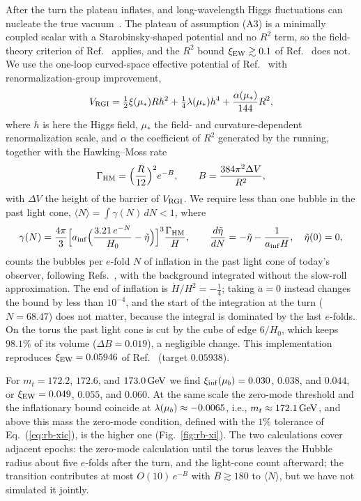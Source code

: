 After the turn the plateau inflates, and long-wavelength Higgs fluctuations can nucleate the true vacuum~\cite{Espinosa:2007qp,Hook:2014uia,Kearney:2015vba,Espinosa:2015qea,Joti:2017fwe,Markkanen:2018pdo}.
The plateau of assumption (A3) is a minimally coupled scalar with a Starobinsky-shaped potential and no $R^2$ term, so the field-theory criterion of Ref.~\cite{Mantziris:2020rzh} applies, and the $R^2$ bound $\xi_{\rm EW}\gtrsim0.1$ of Ref.~\cite{Mantziris:2022fuu} does not. %
We use the one-loop curved-space effective potential of Ref.~\cite{Markkanen:2018bfx} with renormalization-group improvement,
\begin{equation}
V_{\rm RGI}=\tfrac12\xi(\mu_*)Rh^2+\tfrac14\lambda(\mu_*)h^4+\frac{\alpha(\mu_*)}{144}R^2,
\label{eq:rb-VRGI}
\end{equation}
where $h$ is here the Higgs field, $\mu_*$ the field- and curvature-dependent renormalization scale, and $\alpha$ the coefficient of $R^2$ generated by the running, together with the Hawking--Moss rate~\cite{Hawking:1981fz}
\begin{equation}
\Gamma_{\rm HM}=\Bigl(\frac{R}{12}\Bigr)^2e^{-B},\qquad B=\frac{384\pi^2\Delta V}{R^2},
\label{eq:rb-HM}
\end{equation}
with $\Delta V$ the height of the barrier of $V_{\rm RGI}$.
We require less than one bubble in the past light cone, $\langle N\rangle=\int\gamma(N)\,dN<1$, where
\begin{equation}
\gamma(N)=\frac{4\pi}{3}\Bigl[a_{\rm inf}\Bigl(\frac{3.21\,e^{-N}}{H_0}-\tilde\eta\Bigr)\Bigr]^3\frac{\Gamma_{\rm HM}}{H},\qquad \frac{d\tilde\eta}{dN}=-\tilde\eta-\frac{1}{a_{\rm inf}H},\quad\tilde\eta(0)=0,
\label{eq:rb-lightcone}
\end{equation}
counts the bubbles per $e$-fold $N$ of inflation in the past light cone of today's observer, following Refs.~\cite{Mantziris:2020rzh,Mantziris:2022fuu}, with the background integrated without the slow-roll approximation. %
The end of inflation is $\dot H/H^2=-\frac14$; taking $\ddot a=0$ instead changes the bound by less than $10^{-4}$, and the start of the integration at the turn ($N=68.47$) does not matter, because the integral is dominated by the last $e$-folds. %
On the torus the past light cone is cut by the cube of edge $6/H_0$, which keeps $98.1\%$ of its volume ($\Delta B=0.019$), a negligible change. %
This implementation reproduces $\xi_{\rm EW}=0.05946$ of Ref.~\cite{Mantziris:2020rzh} (target $0.05938$). %

For $m_t=172.2$, $172.6$, and $173.0\,\mathrm{GeV}$ we find $\xi_{\rm inf}(\mu_b)=0.030$, $0.038$, and $0.044$, or $\xi_{\rm EW}=0.049$, $0.055$, and $0.060$. %
At the same scale the zero-mode threshold and the inflationary bound coincide at $\lambda(\mu_b)\approx-0.0065$, i.e., $m_t\approx172.1\,\mathrm{GeV}$, and above this mass the zero-mode condition, defined with the $1\%$ tolerance of Eq.~(\ref{eq:rb-xic}), is the higher one (Fig.~\ref{fig:rb-xi}). %
The two calculations cover adjacent epochs: the zero-mode calculation until the torus leaves the Hubble radius about five $e$-folds after the turn, and the light-cone count afterward; the transition contributes at most $O(10)\,e^{-B}$ with $B\gtrsim180$ to $\langle N\rangle$, but we have not simulated it jointly. %

